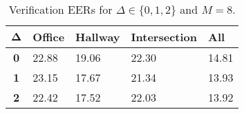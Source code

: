 \begin{table}[h]
    \centering
    \begin{tabular}{|c|M{2cm}|M{2cm}|M{2cm}|M{2cm}|}
    \hline
    $\boldsymbol{\Delta}$ & \bf{Office} & \bf{Hallway} & \bf{Intersection} & \bf{All} \\ 
    \hline 
    \hline
    \bf{0} & 22.88 & 19.06 & 22.30 & 14.81 \\
    \hline
    \bf{1} & 23.15 & 17.67 & 21.34 & 13.93 \\
    \hline
    \bf{2} & 22.42 & 17.52 & 22.03 & 13.92 \\
    \hline
    \end{tabular}
    \caption{Verification EERs for $\Delta \in \{0, 1, 2\}$ and $M = 8$.}
    \label{tab:verify_speakers_M_8}
\end{table}
